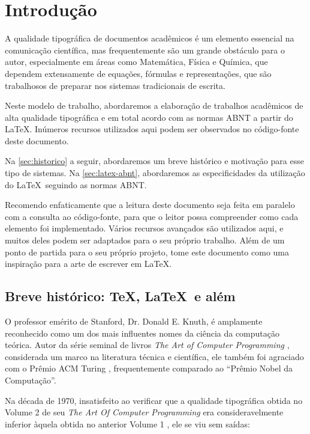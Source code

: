 \chapter{Introdução} \label{chap:intro}

A qualidade tipográfica de documentos acadêmicos é um elemento essencial na comunicação científica, mas frequentemente são um grande obstáculo para o autor, especialmente em áreas como Matemática, Física e Química, que dependem extensamente de equações, fórmulas e representações, que são trabalhosos de preparar nos sistemas tradicionais de escrita.

Neste modelo de trabalho, abordaremos a elaboração de trabalhos acadêmicos de alta qualidade tipográfica e em total acordo com as normas ABNT a partir do \LaTeX. Inúmeros recursos utilizados aqui podem ser observados no código-fonte deste documento.

Na \autoref{sec:historico} a seguir, abordaremos um breve histórico e motivação para esse tipo de sistemas. Na \autoref{sec:latex-abnt}, abordaremos as especificidades da utilização do \LaTeX\ seguindo as normas ABNT.

Recomendo enfaticamente que a leitura deste documento seja feita em paralelo com a consulta ao código-fonte, para que o leitor possa compreender como cada elemento foi implementado. Vários recursos avançados são utilizados aqui, e muitos deles podem ser adaptados para o seu próprio trabalho. Além de um ponto de partida para o seu próprio projeto, tome este documento como uma inspiração para a arte de escrever em \LaTeX.

\section{Breve histórico: \TeX, \LaTeX\ e além} \label{sec:historico}

O professor emérito de Stanford, Dr. Donald E. Knuth, é amplamente reconhecido como um dos mais influentes nomes da ciência da computação teórica. Autor da série seminal de livros \emph{The Art of Computer Programming} \cite{Knuth-TAOCP}, considerada um marco na literatura técnica e científica, ele também foi agraciado com o Prêmio ACM Turing \cite{KnuthTuring1974}, frequentemente comparado ao ``Prêmio Nobel da Computação''.

Na década de 1970, insatisfeito ao verificar que a qualidade tipográfica obtida no Volume 2 de seu \emph{The Art Of Computer Programming} \cite{Knuth-TAOCP-2} era consideravelmente inferior àquela obtida no anterior Volume 1 \cite{Knuth-TAOCP-1}, ele se viu sem saídas:

